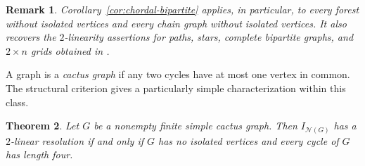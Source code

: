 \documentclass[10pt,a4paper]{amsart}
\newtheorem{theorem}{Theorem}[section]
\newtheorem{remark}[theorem]{Remark}
\numberwithin{equation}{section}
\newcommand{\NN}{\mathcal N}
\begin{document}
	\begin{remark}
		Corollary~\ref{cor:chordal-bipartite} applies, in particular, to every
		forest without isolated vertices and every chain graph without isolated
		vertices. It also recovers the \(2\)-linearity assertions for paths,
		stars, complete bipartite graphs, and \(2\times n\) grids obtained in
		\cite[Theorems~3.2, 3.4, 3.8, and 3.12]{Froberg2026}.
	\end{remark}
	

	A graph is a \emph{cactus graph} if any two cycles have at most one vertex in
	common. The structural criterion gives a particularly simple characterization
	within this class.

	\begin{theorem}\label{thm:cactus-characterization}
		Let \(G\) be a nonempty finite simple cactus graph. Then
		\(I_{\NN(G)}\) has a \(2\)-linear resolution if and only if \(G\) has no
		isolated vertices and every cycle of \(G\) has length four.
	\end{theorem}
\end{document}
